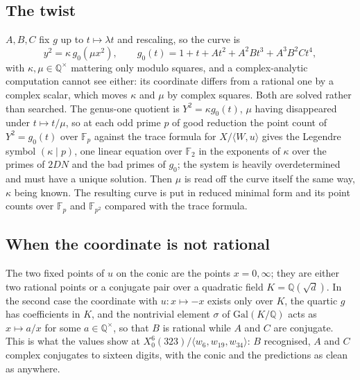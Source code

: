 \documentclass[11pt,reqno]{amsart}
\theoremstyle{plain}
\theoremstyle{definition}
\newcommand{\Q}{\mathbb{Q}}
\newcommand{\F}{\mathbb{F}}
\begin{document}
\subsection*{The twist}
$A,B,C$ fix $g$ up to $t\mapsto\lambda t$ and rescaling, so the curve is
\[
y^2=\kappa\,g_0(\mu x^2),\qquad g_0(t)=1+t+At^2+A^2Bt^3+A^3B^2Ct^4,
\]
with $\kappa,\mu\in\Q^\times$ mattering only modulo squares, and a complex-analytic computation
cannot see either: its coordinate differs from a rational one by a complex scalar, which moves
$\kappa$ and $\mu$ by complex squares. Both are solved rather than searched. The genus-one
quotient is $Y^2=\kappa g_0(t)$, $\mu$ having disappeared under $t\mapsto t/\mu$, so at each odd
prime $p$ of good reduction the point count of $Y^2=g_0(t)$ over $\F_p$ against the trace formula
for $X/\langle W,u\rangle$ gives the Legendre symbol $(\kappa\mid p)$, one linear equation over
$\F_2$ in the exponents of $\kappa$ over the primes of $2DN$ and the bad primes of $g_0$; the
system is heavily overdetermined and must have a unique solution. Then $\mu$ is read off the
curve itself the same way, $\kappa$ being known. The resulting curve is put in reduced minimal
form and its point counts over $\F_p$ and $\F_{p^2}$ compared with the trace formula.

\subsection*{When the coordinate is not rational}
The two fixed points of $u$ on the conic are the points $x=0,\infty$; they are either two rational
points or a conjugate pair over a quadratic field $K=\Q(\sqrt d)$. In the second case the
coordinate with $u\colon x\mapsto -x$ exists only over $K$, the quartic $g$ has coefficients in
$K$, and the nontrivial element $\sigma$ of $\mathrm{Gal}(K/\Q)$ acts as $x\mapsto a/x$ for some
$a\in\Q^\times$, so that $B$ is rational while $A$ and $C$ are conjugate. This is what the
values show at $X_0^{6}(323)/\langle w_6,w_{19},w_{34}\rangle$: $B$ recognised, $A$ and $C$
complex conjugates to sixteen digits, with the conic and the predictions as clean as anywhere.
\end{document}
